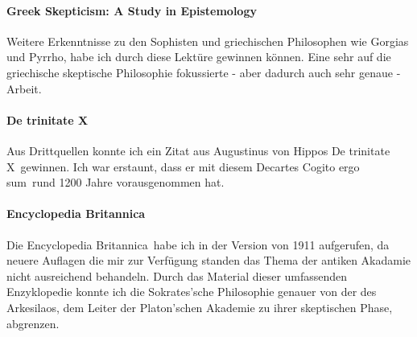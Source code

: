 \documentclass[12pt,a4paper,final]{article}
\begin{document}
\paragraph*{Greek Skepticism: A Study in Epistemology \cite{stough1969greek}} Weitere Erkenntnisse zu den Sophisten und griechischen Philosophen wie Gorgias und Pyrrho, habe ich durch diese Lektüre gewinnen können. Eine sehr auf die griechische skeptische Philosophie fokussierte - aber dadurch auch sehr genaue - Arbeit.
\paragraph*{De trinitate X \cite{trini_x}} Aus Drittquellen konnte ich ein Zitat aus Augustinus von Hippos \glqq De trinitate X\grqq\  gewinnen. Ich war erstaunt, dass er mit diesem Decartes \glqq Cogito ergo sum\grqq\ rund 1200 Jahre
vorausgenommen hat. %
\paragraph*{Encyclopedia Britannica \cite{enc_brit}} Die \glqq Encyclopedia Britannica\grqq\ habe ich in der Version von 1911 aufgerufen, da neuere Auflagen die mir zur Verfügung standen das Thema der antiken Akadamie nicht ausreichend behandeln. Durch das Material dieser umfassenden Enzyklopedie konnte ich die Sokrates'sche Philosophie genauer von der des Arkesilaos, dem Leiter der Platon'schen Akademie zu ihrer skeptischen Phase, abgrenzen.
\end{document}
